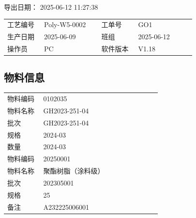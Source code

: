 \documentclass[UTF8,10pt,a4paper,fontset=fandol]{ctexart}
\newcommand{\fieldvalue}[1]{#1}
\begin{document}
\noindent
导出日期：
\fieldvalue{2025-06-12 11:27:38}

\vspace{0.5em}

\begin{tabular}{@{}p{0.18\linewidth}p{0.28\linewidth}p{0.18\linewidth}p{0.28\linewidth}@{}}
工艺编号 &
\fieldvalue{Poly-W5-0002}
&
工单号 &
\fieldvalue{GO1}
\\
生产日期 &
\fieldvalue{2025-06-09}
&
班组 &
\fieldvalue{2025-06-12}
\\
操作员 &
\fieldvalue{PC}
&
软件版本 &
\fieldvalue{V1.18}
\end{tabular}

\vspace{0.75em}

\subsection*{物料信息}

\begin{tabular}{@{}p{0.22\linewidth}p{0.72\linewidth}@{}}
物料编码 &
\fieldvalue{0102035}
\\
物料名称 &
\fieldvalue{GH2023-251-04}
\\
批次 &
\fieldvalue{GH2023-251-04}
\\
规格 &
\fieldvalue{2024-03}
\\
数量 &
\fieldvalue{2024-03}
\\
物料编码 &
\fieldvalue{20250001}
\\
物料名称 &
\fieldvalue{聚酯树脂（涂料级）}
\\
批次 &
\fieldvalue{202305001}
\\
规格 &
\fieldvalue{25}
\\
备注 &
\fieldvalue{A232225006001}
\end{tabular}
\end{document}
